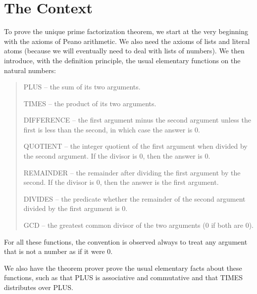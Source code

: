 \documentclass[10pt]{book}
\newenvironment{pubcrown}{\begin{quote}}{\end{quote}}
\begin{document}
\section{The Context}
\label{SSCONTEXT}
To prove the unique prime factorization theorem, we start at
the very beginning with the axioms of Peano arithmetic.
We  also need the axioms of lists and literal atoms (because we
will eventually need to deal with lists of numbers).
We then introduce, with the definition principle, the
usual elementary functions on the natural numbers:
\begin{pubcrown}
PLUS -- the sum of its two arguments.

TIMES -- the product of its two arguments.

DIFFERENCE -- the first argument minus the second argument unless the
first is less than the second, in which case
the answer is 0.

QUOTIENT -- the integer quotient of the first argument when divided
by the second argument.  If the divisor is 0, then the answer is 0.

REMAINDER -- the remainder after dividing the first argument by
the second.  If the divisor is 0, then the answer is the first argument.

DIVIDES -- the predicate whether the remainder of the
second argument divided by the first argument is 0.

GCD -- the greatest common divisor of the two arguments (0 if both
are 0).
\end{pubcrown}

For all these functions, the convention is observed
always to treat any argument that is not a number as if it were 0.

We also have the theorem prover prove the usual elementary facts
about these functions, such as that PLUS is associative and commutative
and that TIMES distributes over PLUS.
\end{document}

